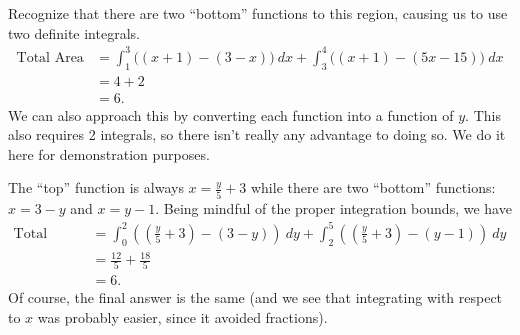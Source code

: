 {Recognize that there are two ``bottom'' functions to this region, causing us to use two definite integrals.
\begin{align*}
	\text{Total Area}
	&= \int_1^3\bigl((x+1)-(3-x)\bigr)\ dx + \int_3^4\bigl((x+1)-(5x-15)\bigr)\ dx \\
	&= 4+2\\
	&= 6.
\end{align*}
We can also approach this by converting each function into a function of $y$. This also requires 2 integrals, so there isn't really any advantage to doing so. We do it here for demonstration purposes.

The ``top'' function is always $x=\frac y5+3$ while there are two ``bottom'' functions: $x=3-y$ and $x=y-1$. Being mindful of the proper integration bounds, we have
\begin{align*}
	\text{Total Area}
	&= \int_0^2\left(\left(\frac y5+3\right) - (3-y)\right)\ dy
	+ \int_2^5\left(\left(\frac y5+3\right) - (y-1)\right)\ dy \\
	&= \frac{12}5 + \frac{18}5 \\
	&= 6.
\end{align*}
Of course, the final answer is the same (and we see that integrating with respect to $x$ was probably easier, since it avoided fractions).}

